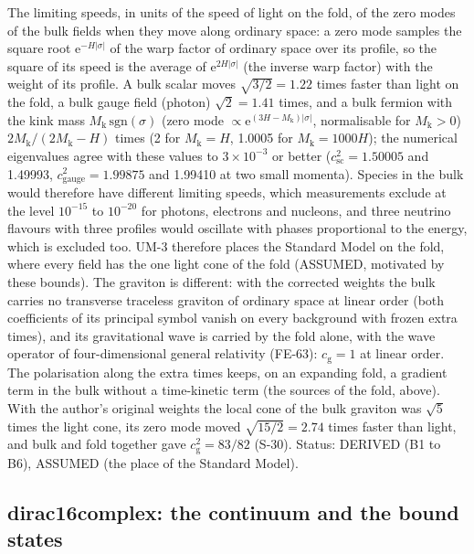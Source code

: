 \documentclass[
  10pt,
]{article}
\begin{document}
The limiting speeds, in units of the speed of light on the fold, of the
zero modes of the bulk fields when they move along ordinary space: a
zero mode samples the square root \(\mathrm{e}^{-H\lvert\sigma\rvert}\)
of the warp factor of ordinary space over its profile, so the square of
its speed is the average of \(\mathrm{e}^{2H\lvert\sigma\rvert}\) (the
inverse warp factor) with the weight of its profile. A bulk scalar moves
\(\sqrt{3/2} = 1.22\) times faster than light on the fold, a bulk gauge
field (photon) \(\sqrt2 = 1.41\) times, and a bulk fermion with the kink
mass \(M_{\mathrm{k}}\,\mathrm{sgn}(\sigma)\) (zero mode
\(\propto \mathrm{e}^{(3H - M_{\mathrm{k}})\lvert\sigma\rvert}\),
normalisable for \(M_{\mathrm{k}} > 0\))
\(2M_{\mathrm{k}}/(2M_{\mathrm{k}} - H)\) times (2 for
\(M_{\mathrm{k}} = H\), 1.0005 for \(M_{\mathrm{k}} = 1000H\)); the
numerical eigenvalues agree with these values to \(3\times10^{-3}\) or
better (\(c_{\mathrm{sc}}^2 = 1.50005\) and 1.49993,
\(c_{\mathrm{gauge}}^2 = 1.99875\) and 1.99410 at two small momenta).
Species in the bulk would therefore have different limiting speeds,
which measurements exclude at the level \(10^{-15}\) to \(10^{-20}\) for
photons, electrons and nucleons, and three neutrino flavours with three
profiles would oscillate with phases proportional to the energy, which
is excluded too. UM-3 therefore places the Standard Model on the fold,
where every field has the one light cone of the fold (ASSUMED, motivated
by these bounds). The graviton is different: with the corrected weights
the bulk carries no transverse traceless graviton of ordinary space at
linear order (both coefficients of its principal symbol vanish on every
background with frozen extra times), and its gravitational wave is
carried by the fold alone, with the wave operator of four-dimensional
general relativity (FE-63): \(c_{\mathrm{g}} = 1\) at linear order. The
polarisation along the extra times keeps, on an expanding fold, a
gradient term in the bulk without a time-kinetic term (the sources of
the fold, above). With the author's original weights the local cone of
the bulk graviton was \(\sqrt5\) times the light cone, its zero mode
moved \(\sqrt{15/2} = 2.74\) times faster than light, and bulk and fold
together gave \(c_{\mathrm{g}}^2 = 83/82\) (S-30). Status: DERIVED (B1
to B6), ASSUMED (the place of the Standard Model).

\hypertarget{dirac16complex-the-continuum-and-the-bound-states}{%
\subsection{dirac16complex: the continuum and the bound
states}\label{dirac16complex-the-continuum-and-the-bound-states}}
\end{document}
